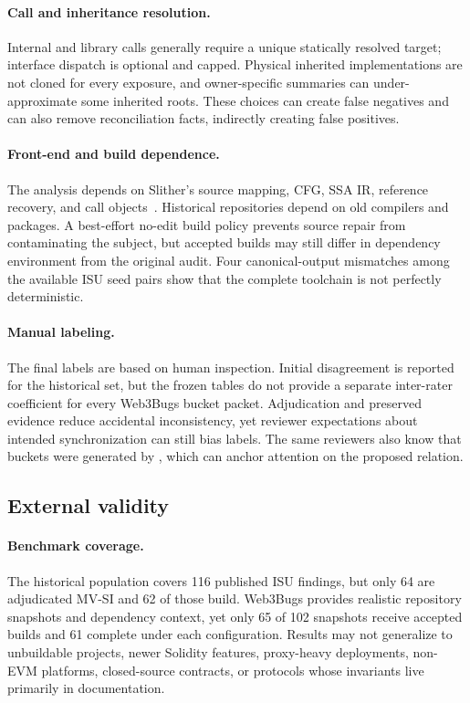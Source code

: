 \paragraph{Call and inheritance resolution.}
Internal and library calls generally require a unique statically resolved target; interface dispatch is optional and capped. Physical inherited implementations are not cloned for every exposure, and owner-specific summaries can under-approximate some inherited roots. These choices can create false negatives and can also remove reconciliation facts, indirectly creating false positives.

\paragraph{Front-end and build dependence.}
The analysis depends on Slither's source mapping, CFG, SSA IR, reference recovery, and call objects~\cite{feist2019slither}. Historical repositories depend on old compilers and packages. A best-effort no-edit build policy prevents source repair from contaminating the subject, but accepted builds may still differ in dependency environment from the original audit. Four canonical-output mismatches among the available ISU seed pairs show that the complete toolchain is not perfectly deterministic.

\paragraph{Manual labeling.}
The final labels are based on human inspection. Initial disagreement is reported for the historical set, but the frozen tables do not provide a separate inter-rater coefficient for every Web3Bugs bucket packet. Adjudication and preserved evidence reduce accidental inconsistency, yet reviewer expectations about intended synchronization can still bias labels. The same reviewers also know that buckets were generated by \sys, which can anchor attention on the proposed relation.

\subsection{External validity}
\label{s:limitations-external}

\paragraph{Benchmark coverage.}
The historical population covers 116 published ISU findings, but only 64 are adjudicated MV-SI and 62 of those build. Web3Bugs provides realistic repository snapshots and dependency context, yet only 65 of 102 snapshots receive accepted builds and 61 complete under each configuration. Results may not generalize to unbuildable projects, newer Solidity features, proxy-heavy deployments, non-EVM platforms, closed-source contracts, or protocols whose invariants live primarily in documentation.

